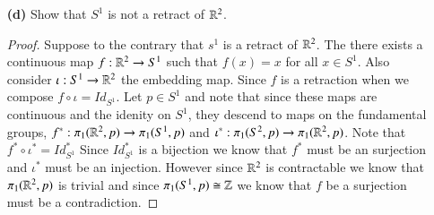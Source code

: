 \documentclass{homework651}
\begin{document}
\begin{problems}
\begin{enumerate}
\begin{proof}
    \end{proof}


    \item[\textbf{(d)}] Show that $S^1$ is not a retract of $\RR^2$. 
    \begin{proof} Suppose to the contrary that $s^1$ is a retract of $\RR^2$. The there exists a 
        continuous map $f: \RR^2 \to S^1$ such that $f(x)=x$ for all $x \in S^1$. Also consider 
        $\iota: S^1 \to \RR^2$ the embedding map. Since $f$ is a retraction when we compose $ f \circ \iota = Id_{S^1}$. 
        Let $p \in S^1$ and note that since these maps are continuous and the idenity on $S^1$, they descend to maps on 
        the fundamental groups, $f^*: \pi_1(\RR^2, p) \to \pi_1(S^1, p)$ and $\iota^*: \pi_1(S^2, p) \to \pi_1(\RR^2, p)$. Note
        that $f^* \circ \iota^* = Id_{S^1}^*$ Since $Id_{S^1}^*$ is a bijection we know that $f^*$ must be an surjection
        and $\iota^*$ must be an injection. However since $\RR^2$ is contractable we know that $\pi_1(\RR^2, p)$ is trivial 
        and since $\pi_1(S^1, p) \cong \mathbb Z$ we know that $f$ be a surjection must be a contradiction. 
    \end{proof}
\end{enumerate} 




\end{problems}
\end{document}
